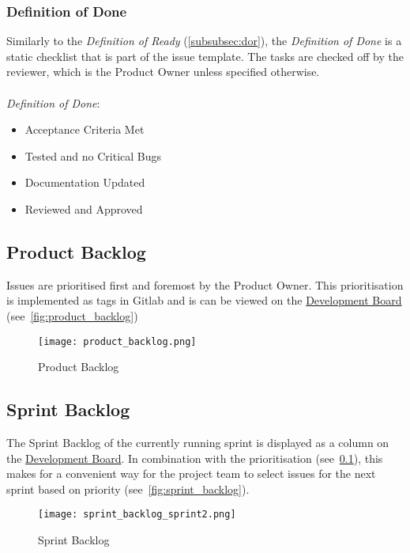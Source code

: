 \subsubsection{Definition of Done}\label{subsubsec:dod}
Similarly to the \textit{Definition of Ready} (\ref{subsubsec:dor}),  the \textit{Definition of Done} is a static checklist that is part of
the issue template. The tasks are checked off by the reviewer, which is the Product Owner unless specified otherwise. \\ \\
\textit{Definition of Done}:
\begin{itemize}
    \item Acceptance Criteria Met
    \item Tested and no Critical Bugs
    \item Documentation Updated
    \item Reviewed and Approved
\end{itemize}
\subsection{Product Backlog}\label{subsec:product_backlog}
Issues are prioritised first and foremost by the Product Owner. This prioritisation is implemented as tags in Gitlab and is can be viewed
on the \href{https://gitlab.ti.bfh.ch/decibel-threshold-event-displayer/decibel-threshold-event-displayer/-/boards/2832}{Development Board} (see\ \autoref{fig:product_backlog})
\begin{figure}[H]
    \centering
    \texttt{[image: product\_backlog.png]}
    \caption{Product Backlog}\label{fig:product_backlog}
\end{figure}
\subsection{Sprint Backlog}
The Sprint Backlog of the currently running sprint is displayed as a column on the \href{https://gitlab.ti.bfh.ch/decibel-threshold-event-displayer/decibel-threshold-event-displayer/-/boards/2832}{Development Board}. In combination with the prioritisation (see\ \ref{subsec:product_backlog}),
this makes for a convenient way for the project team to select issues for the next sprint based on priority (see\ \autoref{fig:sprint_backlog}).
\begin{figure}[H]
    \centering
    \texttt{[image: sprint\_backlog\_sprint2.png]}
    \caption{Sprint Backlog}\label{fig:sprint_backlog}
\end{figure}
